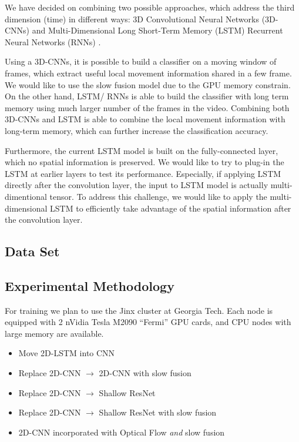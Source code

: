 We have decided on combining two possible approaches, which address
the third dimension (time) in different ways: 3D Convolutional Neural
Networks (3D-CNNs) \cite{stf,cnnvid} and Multi-Dimensional Long
Short-Term Memory (LSTM) Recurrent Neural Networks (RNNs) \cite{ltrcn}. 

Using a 3D-CNNs, it is possible to build a classifier on a moving window
of frames, which extract useful local movement information shared
in a few frame. We would like to use the slow fusion model \cite{cnnvid}
due to the GPU memory constrain. On the other hand, LSTM/ RNNs is
able to build the classifier with long term memory
using much larger number of the frames in the video. 
Combining both 3D-CNNs and LSTM is able to combine the
local movement information with long-term memory,
which can further increase the classification accuracy.

Furthermore, the current LSTM model is built on the fully-connected
layer, which no spatial information is preserved. We would like to
try to plug-in the LSTM at earlier layers to test its performance.
Especially, if applying LSTM directly after the convolution layer,
the input to LSTM model is actually multi-dimentional tensor. To address
this challenge, we would like to apply the multi-dimensional LSTM
\cite{byeon2015scene} to efficiently take advantage of the spatial
information after the convolution layer. 


\subsection*{Data Set}
\subsection*{Experimental Methodology}
For training we plan to use the Jinx cluster at Georgia Tech. Each node is equipped with 2 nVidia Tesla M2090 ``Fermi'' GPU cards, and CPU nodes with large memory are available.
\begin{itemize}
\item Move 2D-LSTM into CNN
\item Replace 2D-CNN $\to$ 2D-CNN with slow fusion
\item Replace 2D-CNN $\to$ Shallow ResNet
\item Replace 2D-CNN $\to$ Shallow ResNet with slow fusion
\item 2D-CNN incorporated with Optical Flow \emph{and} slow fusion
\end{itemize}
